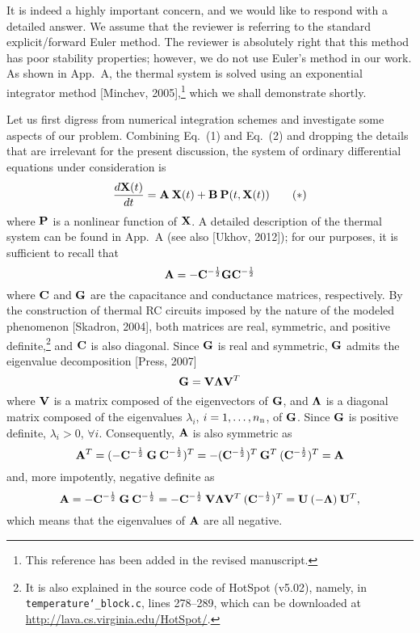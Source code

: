 \begin{authors}
It is indeed a highly important concern, and we would like to respond with a detailed answer.
We assume that the reviewer is referring to the standard explicit/forward Euler method.
The reviewer is absolutely right that this method has poor stability properties; however, we do not use Euler's method in our work.
As shown in App.~A, the thermal system is solved using an exponential integrator method [Minchev, 2005],\footnote{This reference has been added in the revised manuscript.} which we shall demonstrate shortly.

Let us first digress from numerical integration schemes and investigate some aspects of our problem.
Combining Eq.~(1) and Eq.~(2) and dropping the details that are irrelevant for the present discussion, the system of ordinary differential equations under consideration is
\begin{equation}
  \frac{d\vX(\t)}{d\t} = \mA \: \vX(\t) + \mB \: \vP(\t, \vX(\t)) \tag{$\ast$}
\end{equation}
where $\mathbf{P}$ is a nonlinear function of $\mathbf{X}$.
A detailed description of the thermal system can be found in App.~A (see also [Ukhov, 2012]); for our purposes, it is sufficient to recall that
\[
  \mA = -\mC^{-\frac{1}{2}} \mG \mC^{-\frac{1}{2}}
\]
where $\mC$ and $\mG$ are the capacitance and conductance matrices, respectively.
By the construction of thermal RC circuits imposed by the nature of the modeled phenomenon [Skadron, 2004], both matrices are real, symmetric, and positive definite,\footnote{It is also explained in the source code of HotSpot (v5.02), namely, in \texttt{temperature\char`_block.c}, lines 278--289, which can be downloaded at \url{http://lava.cs.virginia.edu/HotSpot/}.} and $\mC$ is also diagonal.
Since $\mG$ is real and symmetric, $\mG$ admits the eigenvalue decomposition [Press, 2007]
\[
    \mG = \m{V} \m{\Lambda} \m{V}^T
\]
where $\m{V}$ is a matrix composed of the eigenvectors of $\mG$, and $\m{\Lambda}$ is a diagonal matrix composed of the eigenvalues $\lambda_i$, $i = 1, \dotsc, {n_\text{n}}$, of $\mG$.
Since $\mG$ is positive definite, $\lambda_i > 0$, $\forall i$.
Consequently, $\mA$ is also symmetric as
\[
  \mA^T = (-\mC^{-\frac{1}{2}} \: \mG \: \mC^{-\frac{1}{2}})^T = -(\mC^{-\frac{1}{2}})^T \: \mG^T \: (\mC^{-\frac{1}{2}})^T = \mA
\]
and, more impotently, negative definite as
\[
  \mA = -\mC^{-\frac{1}{2}} \: \mG \: \mC^{-\frac{1}{2}} = -\mC^{-\frac{1}{2}} \: \m{V} \m{\Lambda} \m{V}^T \: (\mC^{-\frac{1}{2}})^T = \m{U} \: (-\m{\Lambda}) \: \m{U}^T,
\]
which means that the eigenvalues of $\mA$ are all negative.

\end{authors}
